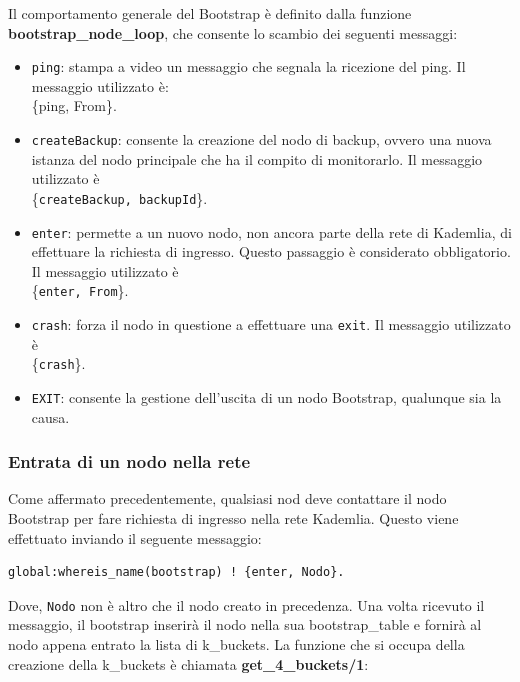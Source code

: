 \documentclass{article}
\begin{document}
Il comportamento generale del Bootstrap è definito dalla funzione \textbf{bootstrap\_node\_loop}, che consente lo scambio dei seguenti messaggi:
\begin{itemize}
    \item \texttt{ping}: stampa a video un messaggio che segnala la ricezione del ping. Il messaggio utilizzato è:\\
    \{ping, From\}.
    \item \texttt{createBackup}: consente la creazione del nodo di backup, ovvero una nuova istanza del nodo principale che ha il compito di monitorarlo. Il messaggio utilizzato è \\
    \{\texttt{createBackup, backupId}\}.
    \item \texttt{enter}: permette a un nuovo nodo, non ancora parte della rete di Kademlia, di effettuare la richiesta di ingresso. Questo passaggio è considerato obbligatorio. Il messaggio utilizzato è \\
    \{\texttt{enter, From}\}.
    \item \texttt{crash}: forza il nodo in questione a effettuare una \texttt{exit}. Il messaggio utilizzato è \\\{\texttt{crash}\}.
    \item \texttt{EXIT}: consente la gestione dell'uscita di un nodo Bootstrap, qualunque sia la causa.
\end{itemize}
\subsubsection{Entrata di un nodo nella rete}
Come affermato precedentemente, qualsiasi nod deve contattare il nodo Bootstrap per fare richiesta di ingresso nella rete Kademlia. Questo viene effettuato inviando il seguente messaggio:
\begin{lstlisting}
global:whereis_name(bootstrap) ! {enter, Nodo}.
\end{lstlisting}
Dove, \texttt{Nodo} non è altro che il nodo creato in precedenza. Una volta ricevuto il messaggio, il bootstrap inserirà il nodo nella sua bootstrap\_table e fornirà al nodo appena entrato la lista di k\_buckets. La funzione che si occupa della creazione della k\_buckets è chiamata \textbf{get\_4\_buckets/1}:
\end{document}
